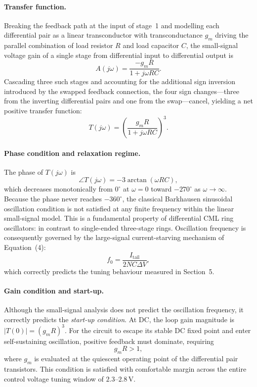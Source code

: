 \documentclass[11pt]{article}
\begin{document}
\paragraph{Transfer function.}
Breaking the feedback path at the input of stage~1 and modelling each differential
pair as a linear transconductor with transconductance $g_m$ driving the parallel
combination of load resistor $R$ and load capacitor $C$, the small-signal voltage
gain of a single stage from differential input to differential output is
%
\begin{equation}
    A(j\omega) = \frac{-g_m R}{1 + j\omega RC}.
    \label{eq:stage_gain}
\end{equation}
%
Cascading three such stages and accounting for the additional sign inversion
introduced by the swapped feedback connection, the four sign changes---three from
the inverting differential pairs and one from the swap---cancel, yielding a net
positive transfer function:
%
\begin{equation}
    T(j\omega) = \left(\frac{g_m R}{1 + j\omega RC}\right)^3.
    \label{eq:loop_gain}
\end{equation}
 
\paragraph{Phase condition and relaxation regime.}
The phase of $T(j\omega)$ is
%
\begin{equation}
    \angle T(j\omega) = -3\arctan(\omega RC),
\end{equation}
%
which decreases monotonically from $0^\circ$ at $\omega = 0$ toward
$-270^\circ$ as $\omega \to \infty$.
Because the phase never reaches $-360^\circ$, the classical Barkhausen sinusoidal
oscillation condition is not satisfied at any finite frequency within the
linear small-signal model.
This is a fundamental property of differential CML ring oscillators: in contrast
to single-ended three-stage rings.
Oscillation frequency is consequently governed by the large-signal
current-starving mechanism of Equation~(4):
%
\begin{equation*}
    f_0 = \frac{I_{\mathrm{tail}}}{2NC\Delta V},
\end{equation*}
%
which correctly predicts the tuning behaviour measured in Section~5.
 
\paragraph{Gain condition and start-up.}
Although the small-signal analysis does not predict the oscillation frequency, it
correctly predicts the \emph{start-up condition}. At DC, the loop gain magnitude
is $|T(0)| = (g_m R)^3$. For the circuit to escape its stable DC fixed point and
enter self-sustaining oscillation, positive feedback must dominate, requiring
%
\begin{equation}
    g_m R > 1,
    \label{eq:startup}
\end{equation}
%
where $g_m$ is evaluated at the quiescent operating point of the differential pair
transistors. This condition is satisfied with comfortable margin across the entire
control voltage tuning window of $2.3$--$2.8\,\mathrm{V}$.
 
\end{document}
